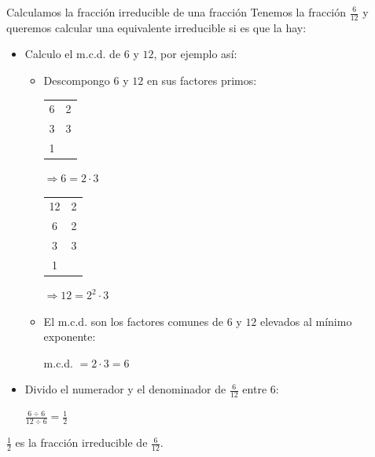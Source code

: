\begin{ejemplos}[label={Ejemplo:mcd}]{Calculamos la fracción irreducible de una fracción}
    Tenemos la fracción $\displaystyle \frac{6}{12}$ y queremos calcular una equivalente irreducible si es que la hay:
    
    \begin{itemize}
        \item Calculo el m.c.d. de $6$ y $12$, por ejemplo así:

        \begin{itemize}
            \item Descompongo $6$ y $12$ en sus factores primos:

            \begin{center}
            \begin{tabular}{c|c}
                6 & 2 \\
                3 & 3 \\
                1
            \end{tabular} $\Rightarrow 6 = 2 \cdot 3$ \qquad
            \begin{tabular}{c|c}
                12 & 2 \\
                \phantom{a} 6 & 2 \\
                \phantom{a}  3 & 3 \\
                 \phantom{a} 1
            \end{tabular} $\Rightarrow 12 = 2^2 \cdot 3$
            \end{center}

            \item El m.c.d. son los factores comunes de $6$ y $12$ elevados al mínimo exponente:

            \begin{center}
                m.c.d. $= 2 \cdot 3 = 6$
            \end{center}
            
        \end{itemize}

        \item Divido el numerador y el denominador de $\displaystyle \frac{6}{12}$ entre $6$:

        \begin{center}
            $\displaystyle \frac{6 \div 6}{12 \div 6} = \frac{1}{2}$
        \end{center}
    \end{itemize}

    $\displaystyle \frac{1}{2}$ es la fracción irreducible de $\displaystyle \frac{6}{12}$.
\end{ejemplos}

